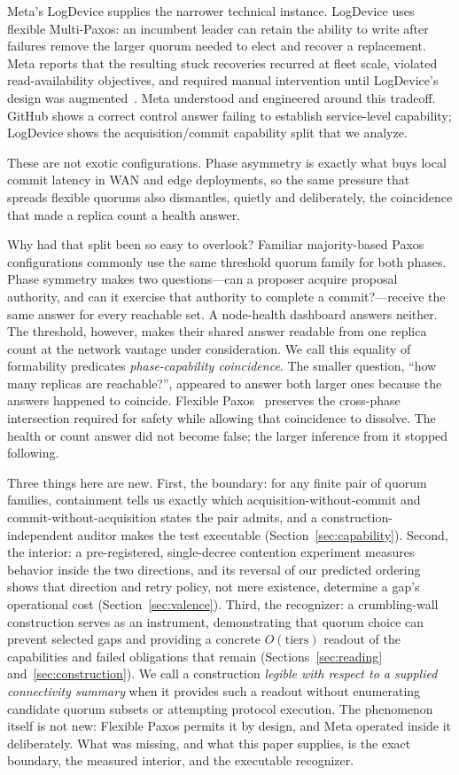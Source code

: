 \documentclass[letterpaper,twocolumn,10pt]{article}
\newcounter{prop}
\newcounter{cor}
\begin{document}
Meta's LogDevice supplies the narrower technical instance. LogDevice uses flexible Multi-Paxos: an incumbent leader can retain the ability to write after failures remove the larger quorum needed to elect and recover a replacement. Meta reports that the resulting stuck recoveries recurred at fleet scale, violated read-availability objectives, and required manual intervention until LogDevice's design was augmented~\cite{meta2022logdevice}. Meta understood and engineered around this tradeoff. GitHub shows a correct control answer failing to establish service-level capability; LogDevice shows the acquisition/commit capability split that we analyze.

These are not exotic configurations. Phase asymmetry is exactly what buys local commit latency in WAN and edge deployments, so the same pressure that spreads flexible quorums also dismantles, quietly and deliberately, the coincidence that made a replica count a health answer.

Why had that split been so easy to overlook? Familiar majority-based Paxos configurations commonly use the same threshold quorum family for both phases. Phase symmetry makes two questions---can a proposer acquire proposal authority, and can it exercise that authority to complete a commit?---receive the same answer for every reachable set. A node-health dashboard answers neither. The threshold, however, makes their shared answer readable from one replica count at the network vantage under consideration. We call this equality of formability predicates \emph{phase-capability coincidence}. The smaller question, ``how many replicas are reachable?'', appeared to answer both larger ones because the answers happened to coincide. Flexible Paxos~\cite{howard2016} preserves the cross-phase intersection required for safety while allowing that coincidence to dissolve. The health or count answer did not become false; the larger inference from it stopped following.

Three things here are new. First, the boundary: for any finite pair of quorum families, containment tells us exactly which acquisition-without-commit and commit-without-acquisition states the pair admits, and a construction-independent auditor makes the test executable (Section~\ref{sec:capability}). Second, the interior: a pre-registered, single-decree contention experiment measures behavior inside the two directions, and its reversal of our predicted ordering shows that direction and retry policy, not mere existence, determine a gap's operational cost (Section~\ref{sec:valence}). Third, the recognizer: a crumbling-wall construction serves as an instrument, demonstrating that quorum choice can prevent selected gaps and providing a concrete $O(\text{tiers})$ readout of the capabilities and failed obligations that remain (Sections~\ref{sec:reading} and~\ref{sec:construction}). We call a construction \emph{legible with respect to a supplied connectivity summary} when it provides such a readout without enumerating candidate quorum subsets or attempting protocol execution. The phenomenon itself is not new: Flexible Paxos permits it by design, and Meta operated inside it deliberately. What was missing, and what this paper supplies, is the exact boundary, the measured interior, and the executable recognizer.
\end{document}
